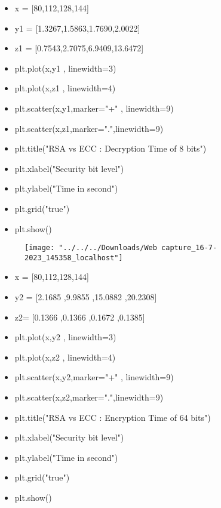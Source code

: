 \documentclass[12pt,a4paper]{article}
\begin{document}
\newpage
\begin{itemize}
	\item x = [80,112,128,144]
	\item y1 = [1.3267,1.5863,1.7690,2.0022]
	\item z1 = [0.7543,2.7075,6.9409,13.6472]
	\item plt.plot(x,y1 , linewidth=3)
	\item plt.plot(x,z1 , linewidth=4)
	\item plt.scatter(x,y1,marker="+" , linewidth=9)
	\item plt.scatter(x,z1,marker=".",linewidth=9)
	\item plt.title("RSA vs ECC : Decryption Time of 8 bits")
	\item plt.xlabel("Security bit level")
	\item plt.ylabel("Time in second")
	\item plt.grid("true")
	\item plt.show()
\end{itemize}		
	
	\begin{figure}[h]
		\centering
		\texttt{[image: "../../../Downloads/Web capture\_16-7-2023\_145358\_localhost"]}
	\end{figure}
	
	
		
	\newpage
		
	\begin{itemize}
		\item x = [80,112,128,144]
		\item y2 = [2.1685 ,9.9855 ,15.0882 ,20.2308]
		\item z2= [0.1366 ,0.1366 ,0.1672 ,0.1385]
	\item plt.plot(x,y2 , linewidth=3)
	\item plt.plot(x,z2 , linewidth=4)
	\item plt.scatter(x,y2,marker="+" , linewidth=9)
	\item plt.scatter(x,z2,marker=".",linewidth=9)
	\item plt.title("RSA vs ECC : Encryption Time of 64 bits")
	\item plt.xlabel("Security bit level")
	\item plt.ylabel("Time in second")
	\item plt.grid("true")
	\item plt.show()
		
	\end{itemize}
	
\end{document}
